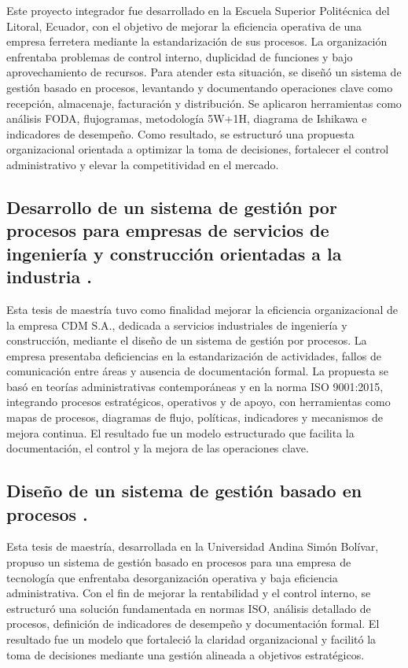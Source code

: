 Este proyecto integrador fue desarrollado en la Escuela Superior Politécnica del Litoral, Ecuador, con el objetivo de mejorar la eficiencia operativa de una empresa ferretera mediante la estandarización de sus procesos. La organización enfrentaba problemas de control interno, duplicidad de funciones y bajo aprovechamiento de recursos. Para atender esta situación, se diseñó un sistema de gestión basado en procesos, levantando y documentando operaciones clave como recepción, almacenaje, facturación y distribución. Se aplicaron herramientas como análisis FODA, flujogramas, metodología 5W+1H, diagrama de Ishikawa e indicadores de desempeño. Como resultado, se estructuró una propuesta organizacional orientada a optimizar la toma de decisiones, fortalecer el control administrativo y elevar la competitividad en el mercado.

\subsection{Desarrollo de un sistema de gestión por procesos para empresas de servicios de ingeniería y construcción orientadas a la industria \cite{Munoz2018}.}

Esta tesis de maestría tuvo como finalidad mejorar la eficiencia organizacional de la empresa CDM S.A., dedicada a servicios industriales de ingeniería y construcción, mediante el diseño de un sistema de gestión por procesos. La empresa presentaba deficiencias en la estandarización de actividades, fallos de comunicación entre áreas y ausencia de documentación formal. La propuesta se basó en teorías administrativas contemporáneas y en la norma ISO 9001:2015, integrando procesos estratégicos, operativos y de apoyo, con herramientas como mapas de procesos, diagramas de flujo, políticas, indicadores y mecanismos de mejora continua. El resultado fue un modelo estructurado que facilita la documentación, el control y la mejora de las operaciones clave.

\subsection{Diseño de un sistema de gestión basado en procesos \cite{Jacome2016}.}

Esta tesis de maestría, desarrollada en la Universidad Andina Simón Bolívar, propuso un sistema de gestión basado en procesos para una empresa de tecnología que enfrentaba desorganización operativa y baja eficiencia administrativa. Con el fin de mejorar la rentabilidad y el control interno, se estructuró una solución fundamentada en normas ISO, análisis detallado de procesos, definición de indicadores de desempeño y documentación formal. El resultado fue un modelo que fortaleció la claridad organizacional y facilitó la toma de decisiones mediante una gestión alineada a objetivos estratégicos.

